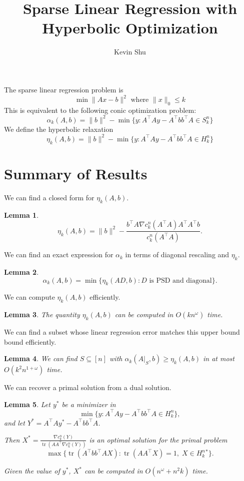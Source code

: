 \documentclass[a4paper]{article}
\author{Kevin Shu}
\title{Sparse Linear Regression with Hyperbolic Optimization}
\newtheorem{lemma}{Lemma}
\DeclareMathOperator*{\tr}{tr}
\begin{document}
The sparse linear regression problem is
\[
    \min \|A x - b\|^2 \text{ where }\|x\|_0 \le k
\]
This is equivalent to the following conic optimization problem:
\begin{equation}\label{eq:tight}
    \alpha_k(A, b) = 
    \|b\|^2 - \min \{y : A^{\intercal}A y - A^{\intercal}bb^{\intercal}A \in S^{n}_k\}
\end{equation}
We define the hyperbolic relaxation
\begin{equation}\label{eq:relax}
    \eta_k(A, b) = 
    \|b\|^2 - \min \{y : A^{\intercal}A y - A^{\intercal}bb^{\intercal}A \in H^{n}_k\}
\end{equation}
\section{Summary of Results}
We can find a closed form for $\eta_k(A,b)$.
\begin{lemma}
    \[
        \eta_k(A, b) = \|b\|^2 - \frac{b^{\intercal} A\nabla c_k^n(A^{\intercal}A)A^{\intercal} A^{\intercal}b}{c_k^n(A^{\intercal}A)}.
    \]
\end{lemma}

We can find an exact expression for $\alpha_k$ in terms of diagonal rescaling and $\eta_k$.
\begin{lemma}
\[\alpha_k(A, b) =  \min \{ \eta_k(AD, b) : {D \text{ is PSD and diagonal}}\}.\]
\end{lemma}

We can compute $\eta_k(A,b)$ efficiently.
\begin{lemma}
    The quantity $\eta_k(A, b)$ can be computed in $O(kn^{\omega})$ time.
\end{lemma}

We can find a subset whose linear regression error matches this upper bound bound efficiently.
\begin{lemma}
    We can find $S \subseteq [n]$ with $\alpha_k(A|_S, b) \ge \eta_k(A, b)$ in at most $O(k^2n^{1+\omega})$ time.
\end{lemma}

We can recover a primal solution from a dual solution.
\begin{lemma}
    Let $y^*$ be a minimizer in 
\[
    \min \{y : A^{\intercal}A y - A^{\intercal}bb^{\intercal}A \in H^n_k\},
\]
and let $Y^* = A^{\intercal}A y^* - A^{\intercal}bb^{\intercal}A$.

Then $X^* = \frac{\nabla c_k^n(Y)}{\tr(AA^{\intercal}\nabla c_k^n(Y))}$ is an optimal solution for the primal problem
\[
    \max \{\tr(A^{\intercal}bb^{\intercal}A X) : \tr(AA^{\intercal} X) = 1, \; X \in H^n_k^*\}.
\]

Given the value of $y^*$, $X^*$ can be computed in $O(n^{\omega} + n^2k)$ time.
\end{lemma}
\end{document}
